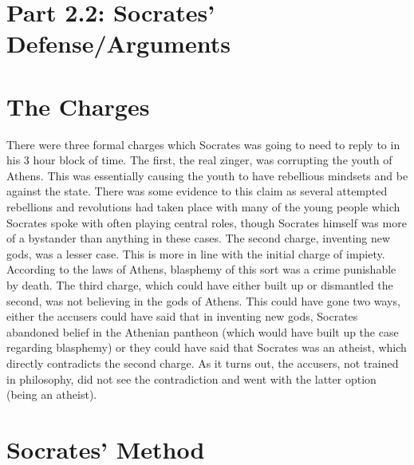\section{Part 2.2: Socrates' Defense/Arguments}

\section{The Charges}

There were three formal charges which Socrates was going to need to reply to in his 3 hour block of time. The first, the real zinger, was corrupting the youth of Athens. This was essentially causing the youth to have rebellious mindsets and be against the state. There was some evidence to this claim as several attempted rebellions and revolutions had taken place with many of the young people which Socrates spoke with often playing central roles, though Socrates himself was more of a bystander than anything in these cases.  The second charge, inventing new gods, was a lesser case. This is more in line with the initial charge of impiety. According to the laws of Athens, blasphemy of this sort was a crime punishable by death.  The third charge, which could have either built up or dismantled the second, was not believing in the gods of Athens. This could have gone two ways, either the accusers could have said that in inventing new gods, Socrates abandoned belief in the Athenian pantheon (which would have built up the case regarding blasphemy) or they could have said that Socrates was an atheist, which directly contradicts the second charge. As it turns out, the accusers, not trained in philosophy, did not see the contradiction and went with the latter option (being an atheist).
\section{Socrates' Method}

